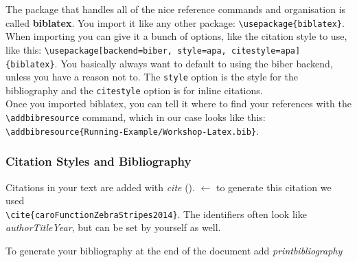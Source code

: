 \documentclass[12pt]{scrarticle}
\begin{document}
The package that handles all of the nice reference commands and organisation is called \textbf{biblatex}. You import it like any other package: \texttt{\textbackslash usepackage\{biblatex\}}. When importing you can give it a bunch of options, like the citation style to use, like this: \texttt{\textbackslash usepackage[backend=biber, style=apa, citestyle=apa]\{biblatex\}}. You basically always want to default to using the biber backend, unless you have a reason not to. The \texttt{style} option is the style for the bibliography and the \texttt{citestyle} option is for inline citations.\\
Once you imported biblatex, you can tell it where to find your references with the \texttt{\textbackslash addbibresource} command, which in our case looks like this:\\
\texttt{\textbackslash addbibresource\{Running-Example/Workshop-Latex.bib\}}.

\subsubsection{Citation Styles and Bibliography}

Citations in your text are added with \textit{cite} (\cite{caroFunctionZebraStripes2014}). $\leftarrow$ to generate this citation we used\\
\texttt{\textbackslash cite\{caroFunctionZebraStripes2014\}}. The identifiers often look like \textit{authorTitleYear}, but can be set by yourself as well.

To generate your bibliography at the end of the document add \textit{printbibliography}

\printbibliography
\end{document}
